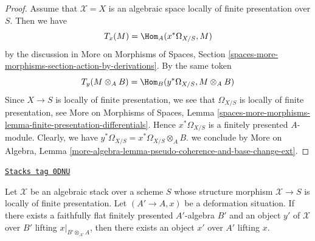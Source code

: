 \begin{proof}
\medskip\noindent
Assume that $\mathcal{X} = X$ is an algebraic space locally of finite
presentation over $S$. Then we have
$$
T_x(M) = \Hom_A(x^*\Omega_{X/S}, M)
$$
by the discussion in More on Morphisms of Spaces, Section
\ref{spaces-more-morphisms-section-action-by-derivations}.
By the same token
$$
T_y(M \otimes_A B) = \Hom_B(y^*\Omega_{X/S}, M \otimes_A B)
$$
Since $X \to S$ is locally of finite presentation, we see that
$\Omega_{X/S}$ is locally of finite presentation, see
More on Morphisms of Spaces, Lemma
\ref{spaces-more-morphisms-lemma-finite-presentation-differentials}.
Hence $x^*\Omega_{X/S}$ is a finitely presented $A$-module.
Clearly, we have $y^*\Omega_{X/S} = x^*\Omega_{X/S} \otimes_A B$.
we conclude by More on Algebra, Lemma
\ref{more-algebra-lemma-pseudo-coherence-and-base-change-ext}.
\end{proof}

\begin{lemma}
\label{stacks-more-morphisms-lemma-local-lift-enough}
\href{https://stacks.math.columbia.edu/tag/0DNU}{\texttt{Stacks tag 0DNU}}

Let $\mathcal{X}$ be an algebraic stack over a scheme $S$ whose
structure morphism $\mathcal{X} \to S$ is locally of finite presentation.
Let $(A' \to A, x)$ be a deformation situation. If there exists a
faithfully flat finitely presented $A'$-algebra $B'$ and an
object $y'$ of $\mathcal{X}$ over $B'$ lifting $x|_{B' \otimes_{A'} A}$,
then there exists an object $x'$ over $A'$ lifting $x$.
\end{lemma}

